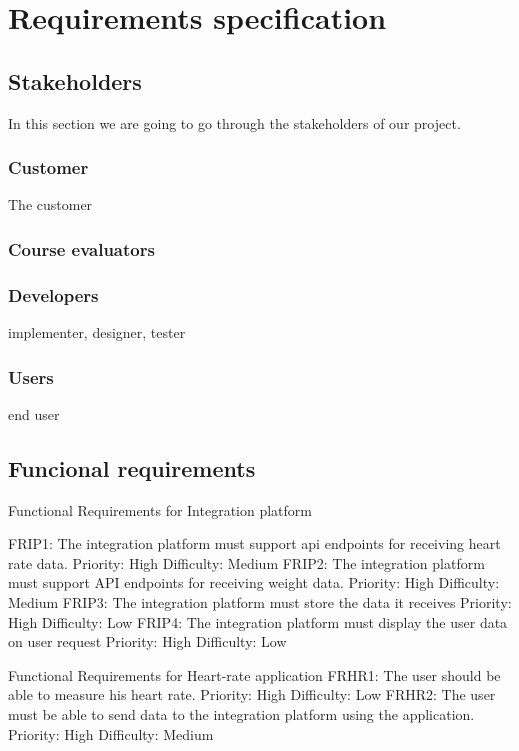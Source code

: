 \chapter{Requirements specification}
\label{Requirements}

\section{Stakeholders}

In this section we are going to go through the stakeholders of our project.

\subsection{Customer}

The customer 

\subsection{Course evaluators}

\subsection{Developers}
implementer, designer, tester

\subsection{Users}
end user

\section{Funcional requirements}

Functional Requirements for Integration platform

FRIP1: The integration platform must support api endpoints for receiving heart rate data.
Priority: High
Difficulty: Medium
FRIP2: The integration platform must support API endpoints for receiving weight data.
Priority: High
Difficulty: Medium
FRIP3: The integration platform must store the data it receives
Priority: High
Difficulty: Low
FRIP4: The integration platform must display the user data on user request
Priority: High
Difficulty: Low

Functional Requirements for Heart-rate application
FRHR1: The user should be able to measure his heart rate.
Priority: High Difficulty: Low
FRHR2: The user must be able to send data to the integration platform using the application.
Priority: High Difficulty: Medium

